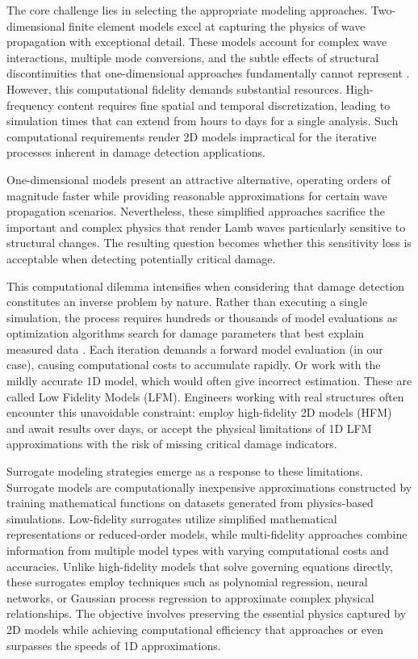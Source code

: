 \documentclass[12pt,a4paper]{report}
\begin{document}
The core challenge lies in selecting the appropriate modeling approaches. Two-dimensional finite element models excel at capturing the physics of wave propagation with exceptional detail. These models account for complex wave interactions, multiple mode conversions, and the subtle effects of structural discontinuities that one-dimensional approaches fundamentally cannot represent \citep{Fan2024}. However, this computational fidelity demands substantial resources. High-frequency content requires fine spatial and temporal discretization, leading to simulation times that can extend from hours to days for a single analysis. Such computational requirements render 2D models impractical for the iterative processes inherent in damage detection applications.

One-dimensional models present an attractive alternative, operating orders of magnitude faster while providing reasonable approximations for certain wave propagation scenarios. Nevertheless, these simplified approaches sacrifice the important and complex physics that render Lamb waves particularly sensitive to structural changes. The resulting question becomes whether this sensitivity loss is acceptable when detecting potentially critical damage.

This computational dilemma intensifies when considering that damage detection constitutes an inverse problem by nature. Rather than executing a single simulation, the process requires hundreds or thousands of model evaluations as optimization algorithms search for damage parameters that best explain measured data \citep{YU2023107030}. Each iteration demands a forward model evaluation (in our case), causing computational costs to accumulate rapidly. Or work with the mildly accurate 1D model, which would often give incorrect estimation. These are called Low Fidelity Models (LFM). Engineers working with real structures often encounter this unavoidable constraint: employ high-fidelity 2D models (HFM) and await results over days, or accept the physical limitations of 1D LFM approximations with the risk of missing critical damage indicators.

Surrogate modeling strategies emerge as a response to these limitations. Surrogate models are computationally inexpensive approximations constructed by training mathematical functions on datasets generated from physics-based simulations. Low-fidelity surrogates utilize simplified mathematical representations or reduced-order models, while multi-fidelity approaches combine information from multiple model types with varying computational costs and accuracies. Unlike high-fidelity models that solve governing equations directly, these surrogates employ techniques such as polynomial regression, neural networks, or Gaussian process regression to approximate complex physical relationships. The objective involves preserving the essential physics captured by 2D models while achieving computational efficiency that approaches or even surpasses the speeds of 1D approximations.
\end{document}
